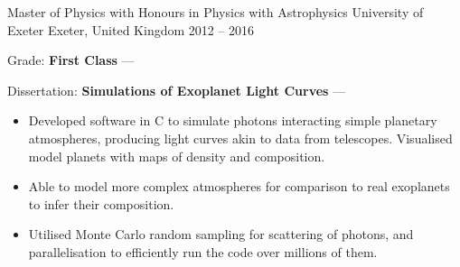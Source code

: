 \begin{cventries}
    \cventry
        {Master of Physics with Honours in Physics with Astrophysics}
        {University of Exeter}
        {Exeter, United Kingdom}
        {2012 -- 2016}
        {
        \begin{cvitems} %
            \item {Grade: \textbf{First Class} --- }
            \item {Dissertation: \textbf{Simulations of Exoplanet Light Curves} --- }
            \vpaddingEduSubpoint
            \begin{itemize}[itemsep=\vPaddingLength, label=\bullet]
                \item{Developed software in C to simulate photons interacting simple planetary atmospheres, producing light curves akin to data from telescopes. Visualised model planets with maps of density and composition.}
                \item{Able to model more complex atmospheres for comparison to real exoplanets to infer their composition.}
                \item{Utilised Monte Carlo random sampling for scattering of photons, and parallelisation to efficiently run the code over millions of them.}
            \end{itemize}
        \end{cvitems}
        } %
\end{cventries}
